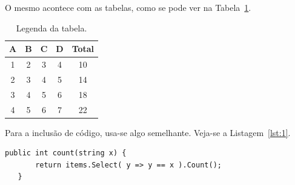 O mesmo acontece com as tabelas, como se pode ver na Tabela~\ref{tab:1}.

\begin{table}[htb]
    \centering
    \begin{tabular}{ccccc}
        \toprule
        \textbf{A} & \textbf{B} & \textbf{C} & \textbf{D} & \textbf{Total} \\
        \midrule
          1 & 2 & 3 & 4 & 10  \\
          2 & 3 & 4 & 5 & 14  \\
          3 & 4 & 5 & 6 & 18  \\
          4 & 5 & 6 & 7 & 22  \\
         \bottomrule
    \end{tabular}
    \caption{Legenda da tabela.}
    \label{tab:1}
\end{table}

Para a inclusão de código, usa-se algo semelhante. Veja-se a Listagem~\ref{lst:1}.

\begin{lstlisting}[language={[sharp]c},
                   caption={Método para contar o número de elementos numa lista iguais a uma determinada string.},
                   label=lst:1]
   public int count(string x) {
       return items.Select( y => y == x ).Count();
   }
\end{lstlisting}
